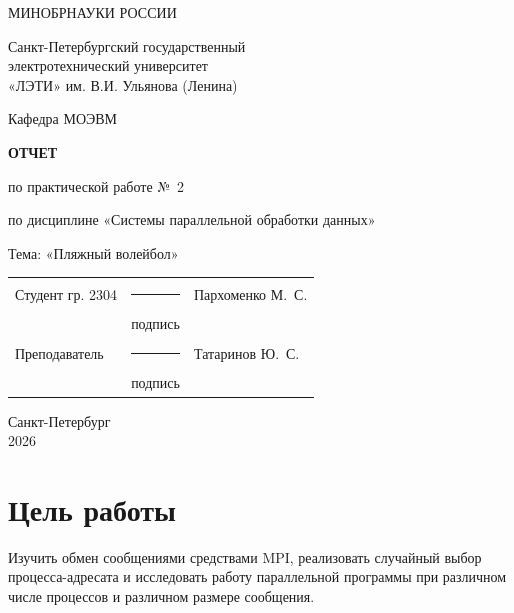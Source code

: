 \documentclass[14pt,a4paper]{extarticle}
\newcommand{\Ministry}{МИНОБРНАУКИ РОССИИ}
\newcommand{\University}{Санкт-Петербургский государственный\\
электротехнический университет\\
«ЛЭТИ» им. В.И. Ульянова (Ленина)}
\newcommand{\Department}{МОЭВМ}
\newcommand{\StudentName}{Пархоменко М.~С.}
\newcommand{\StudentGroup}{2304}
\newcommand{\TeacherName}{Татаринов Ю.~С.}
\newcommand{\City}{Санкт-Петербург}
\begin{document}
\begin{titlepage}
    \thispagestyle{empty}
    \begin{center}
        \Ministry

        \University

        Кафедра \Department
    \end{center}

    \vspace{2cm}

    \begin{center}
        \textbf{ОТЧЕТ}

        по практической работе №~2

        по дисциплине «Системы параллельной обработки данных»

        \vspace{0.5cm}
        Тема: «Пляжный волейбол»
    \end{center}

    \vspace{2cm}

    \begin{flushright}
        \begin{minipage}{0.8\textwidth}
            \begin{tabularx}{\linewidth}{@{}p{4.8cm}
                >{\centering\arraybackslash}p{2.8cm} X@{}}
                Студент гр. \StudentGroup
                & \rule{2.5cm}{0.4pt} & \StudentName\\
                & подпись & \\[0.8cm]
                Преподаватель
                & \rule{2.5cm}{0.4pt} & \TeacherName\\
                & подпись &
            \end{tabularx}
        \end{minipage}
    \end{flushright}

    \vfill

    \begin{center}
        \City\\
        2026
    \end{center}
\end{titlepage}

\setcounter{page}{2}

\section{Цель работы}

Изучить обмен сообщениями средствами MPI, реализовать случайный выбор
процесса-адресата и исследовать работу параллельной программы при различном
числе процессов и различном размере сообщения.
\end{document}
